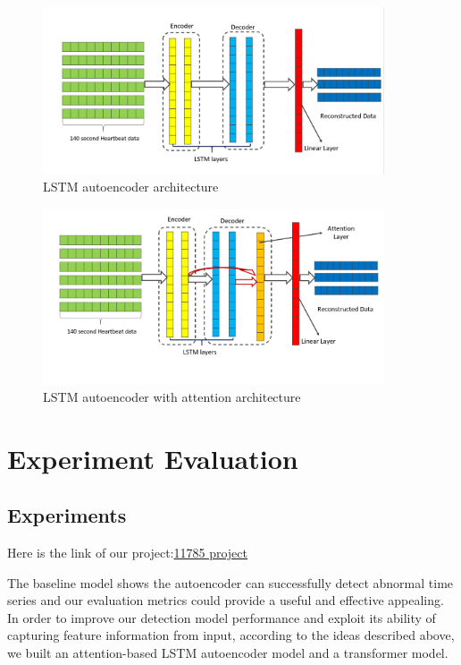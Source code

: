 \documentclass{article}
\begin{document}
\begin{figure}
    \centering
    \includegraphics[width=0.9\textwidth]{images/lstmautoencoder.png}
    \caption{LSTM autoencoder architecture}
\end{figure}

\begin{figure}
    \centering
    \includegraphics[width=0.9\textwidth]{images/lstmautoencoderattention.png}
    \caption{LSTM autoencoder with attention architecture}
\end{figure}




\section{Experiment Evaluation}

\subsection{Experiments}
Here is the link of our project:\href{https://github.com/Dylan-Wyl10/11-785-20F-project}{11785 project} 


The baseline model shows the autoencoder can successfully detect abnormal time series and our evaluation metrics could provide a useful and effective appealing. In order to improve our detection model performance and exploit its ability of capturing feature information from input, according to the ideas described above, we built an attention-based LSTM autoencoder model and a transformer model. 
\end{document}
